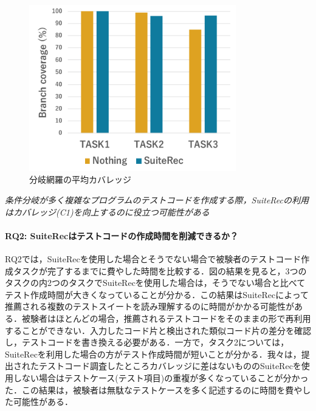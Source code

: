 \documentclass[12pt]{jarticle} %
\begin{document}
\begin{figure}[htbp]
  \begin{center}
   \includegraphics[width=9cm]{C1.pdf}
  \caption{分岐網羅の平均カバレッジ}
  \label{C1}
  \end{center}
\end{figure}


\begin{breakbox}
\textit{条件分岐が多く複雑なプログラムのテストコードを作成する際，{\sf SuiteRec}の利用はカバレッジ(C1)を向上するのに役立つ可能性がある}
\end{breakbox}

\paragraph{RQ2: {\sf SuiteRec}はテストコードの作成時間を削減できるか？}RQ2では，{\sf SuiteRec}を使用した場合とそうでない場合で被験者のテストコード作成タスクが完了するまでに費やした時間を比較する．図の結果を見ると，3つのタスクの内2つのタスクで{\sf SuiteRec}を使用した場合は，そうでない場合と比べてテスト作成時間が大きくなっていることが分かる．この結果は{\sf SuiteRec}によって推薦される複数のテストスイートを読み理解するのに時間がかかる可能性がある．被験者はほとんどの場合，推薦されるテストコードをそのままの形で再利用することができない．入力したコード片と検出された類似コード片の差分を確認し，テストコードを書き換える必要がある．一方で，タスク2については，{\sf SuiteRec}を利用した場合の方がテスト作成時間が短いことが分かる．我々は，提出されたテストコード調査したところカバレッジに差はないものの{\sf SuiteRec}を使用しない場合はテストケース(テスト項目)の重複が多くなっていることが分かった．この結果は，被験者は無駄なテストケースを多く記述するのに時間を費やした可能性がある．
\end{document}
